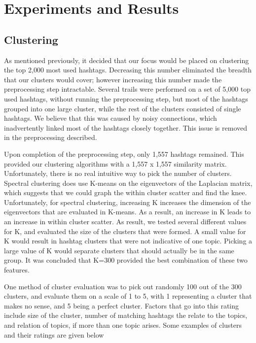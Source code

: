 \section{Experiments and Results}

\subsection{Clustering}
As mentioned previously, it decided that our focus would be placed on clustering the top 2,000 most used hashtags. Decreasing this number eliminated the breadth that our clusters would cover; however increasing this number made the preprocessing step intractable. Several trails were performed on a set of 5,000 top used hashtags, without running the preprocessing step, but most of the hashtags grouped into one large cluster, while the rest of the clusters consisted of single hashtags. We believe that this was caused by noisy connections, which inadvertently linked most of the hashtags closely together. This issue is removed in the preprocessing described. 

Upon completion of the preprocessing step, only 1,557 hashtags remained. This provided our clustering algorithms with a 1,557 x 1,557 similarity matrix. Unfortunately, there is no real intuitive way to pick the number of clusters. Spectral clustering does use K-means on the eigenvectors of the Laplacian matrix, which suggests that we could graph the within cluster scatter and find the knee. Unfortunately, for spectral clustering, increasing K increases the dimension of the eigenvectors that are evaluated in K-means. As a result, an increase in K leads to an increase in within cluster scatter. As result, we tested several different values for K, and evaluated the size of the clusters that were formed. A small value for K would result in hashtag clusters that were not indicative of one topic. Picking a large value of K would separate clusters that should actually be in the same group. It was concluded that K=300 provided the best combination of these two features. 

One method of cluster evaluation was to pick out randomly 100 out of the 300 clusters, and evaluate them on a scale of 1 to 5, with 1 representing a cluster that makes no sense, and 5 being a perfect cluster. Factors that go into this rating include size of the cluster, number of matching hashtags the relate to the topics, and relation of topics, if more than one topic arises. Some examples of clusters and their ratings are given below

